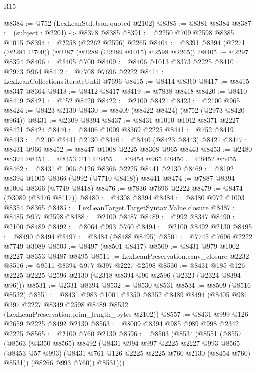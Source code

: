 \begin{lexlean}{R15}
\begin{coremodule}
@8384 := @752 (LexLeanStd.Json.quoted @2102)
@8385 := @8381 @8384
@8387 := (subject : @2201) -> @8378 @8385
@8391 := @2250 @709 @2598 @8385 @1015
@8394 := @2258 (@2262 @2596) @2265
@8404 := @8391 @8394 (@2271 (@2281 @709)) (@2287 (@2288 (@2289 @1015) @2598 @2265))
@8405 := @2297 @8394
@8406 := @8405 @700
@8409 := @8406 @1013 @8373 @2225
@8410 := @2973 @964
@8412 := @7708 @7696 @2222
@8414 := LexLeanCollections.iterateUntil @7696
@8415 := @8414 @8360
@8417 := @8415 @8347 @8364
@8418 := @8412 @8417
@8419 := @7838 @8418
@8420 := @8410 @8419
@8421 := @752 @8420
@8422 := @2100 @8421
@8423 := @2100 @965
@8424 := @8423 @2130
@8430 := @8409 (@8422 @8424) (@752 (@2973 @8420 @964))
@8431 := @2309 @8394
@8437 := @8431 @1010 @1012 @8371 @2227 @8421 @8424
@8440 := @8406 @1009 @8369 @2225
@8441 := @752 @8419
@8443 := @2100 @8441 @2130
@8446 := @8440 (@8423 @8443) @8421
@8447 := @8431 @966
@8452 := @8447 @1008 @2225 @8368 @965 @8443
@8453 := @2480 @8394
@8454 := @8453 @11
@8455 := @8454 @965
@8456 := @8452 @8455
@8462 := @8431 @1006 @126 @8366 @2225 @8441 @2130
@8469 := @8192 @8394 @1005 @8366 (@992 (@7710 @8418)) @8441
@8474 := @7887 @8394 @1004 @8366 (@7749 @8418)
@8476 := @7836 @7696 @2222
@8479 := @8474 (@3089 (@8476 @8417))
@8480 := @4308 @8394
@8484 := @8480 @972 @1003 @8354 @8365
@8485 := LexLeanTarget.TargetSyntax.Value.closure
@8487 := @8485 @977 @2598
@8488 := @2100 @8487
@8489 := @992 @8347
@8490 := @2100 @8489
@8492 := @8064 @993 @760
@8494 := @2100 @8492 @2130
@8495 := @8490 @8494
@8497 := @8484 (@8488 @8495)
@8501 := @7745 @7696 @2222 @7749 @3089
@8503 := @8497 (@8501 @8417)
@8509 := @8431 @979 @1002 @2227 @8353 @8487 @8495
@8511 := LexLeanPreservation.conv_closure @2232
@8516 := @8511 @8394 @977 @397 @2227 @2598
@8530 := @8431 @185 @126 @2225 @2225 @2596 @2130 (@2318 @8394 @96 @2596 (@2323 (@2324 @8394 @96)))
@8531 := @2331 @8394
@8532 := @8530 @8531
@8534 := @8509 (@8516 @8532)
@8551 := @8431
    @983
    @1001
    @8350
    @8352
    @8489
    @8494
    (@8405 @981 @397 @2227 @8349 @2598 @8489 @8532 (LexLeanPreservation.prim_length_bytes @2102))
@8557 := @8431 @999 @126 @2659 @2225 @8492 @2130
@8563 := @8009 @8394 @985 @989 @998 @2342 @2225
@8565 := @2100 @760 @2130
@8596 := @8503
    (@8534
      (@8551
        (@8557
          (@8563
            (@4350 @8565)
            @8492
            (@8431
              @994
              @997
              @2225
              @2227
              @993
              @8565
              (@8453 @57 @993)
              (@8431 @761 @126 @2225 @2225 @760 @2130 (@8454 @760) @8531))
            (@8266 @993 @760))
          @8531)))

\end{coremodule}
\end{lexlean}
